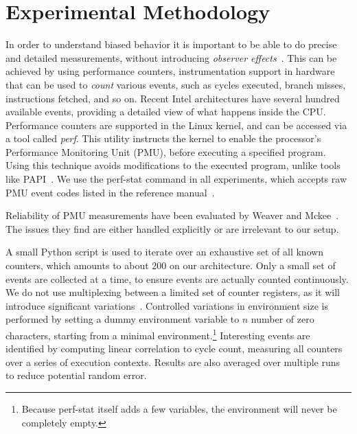 \documentclass[10pt, conference, compsocconf]{IEEEtran}
\begin{document}
\section{Experimental Methodology}
\label{sec:methodology}
In order to understand biased behavior it is important to be able to do precise and detailed measurements, without introducing \emph{observer effects}~\cite{Mytkowicz:2008:OE&MB}.
This can be achieved by using performance counters, instrumentation support in hardware that can be used to \emph{count} various events, such as cycles executed, branch misses, instructions fetched, and so on.
Recent Intel architectures have several hundred available events, providing a detailed view of what happens inside the CPU.
Performance counters are supported in the Linux kernel, and can be accessed via a tool called \emph{perf}.
This utility instructs the kernel to enable the processor's Performance Monitoring Unit (PMU), before executing a specified program.
Using this technique avoids modifications to the executed program, unlike tools like PAPI~\cite{PAPI:PortableInterface}.
We use the perf-stat command in all experiments, which accepts raw PMU event codes listed in the reference manual~\cite{Volume3B}.

Reliability of PMU measurements have been evaluated by Weaver and Mckee~\cite{Weaver:2008:PCTrusted}.
The issues they find are either handled explicitly or are irrelevant to our setup.

A small Python script is used to iterate over an exhaustive set of all known counters, which amounts to about 200 on our architecture.
Only a small set of events are collected at a time, to ensure events are actually counted continuously.
We do not use multiplexing between a limited set of counter registers, as it will introduce significant variations~\cite{Wiplove:ImproveEstimation}. %
Controlled variations in environment size is performed by setting a dummy environment variable to $n$ number of zero characters, starting from a minimal environment.\footnote{Because perf-stat itself adds a few variables, the environment will never be completely empty.}
Interesting events are identified by computing linear correlation to cycle count, measuring all counters over a series of execution contexts.
Results are also averaged over multiple runs to reduce potential random error.%
\end{document}
